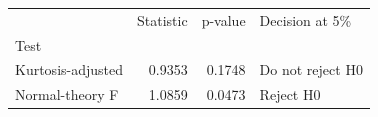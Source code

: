 \begin{tabular}{lrrl}
\toprule
 & Statistic & p-value & Decision at 5\% \\
Test &  &  &  \\
\midrule
Kurtosis-adjusted & 0.9353 & 0.1748 & Do not reject H0 \\
Normal-theory F & 1.0859 & 0.0473 & Reject H0 \\
\bottomrule
\end{tabular}
